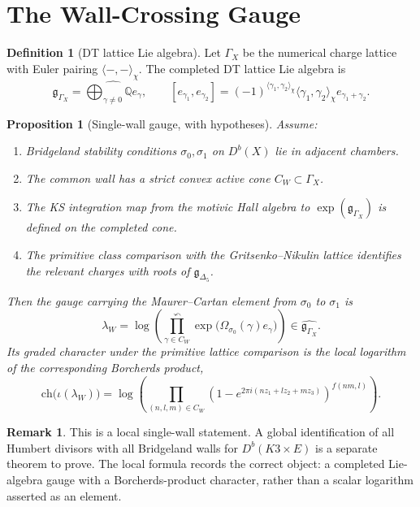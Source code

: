 \documentclass[11pt]{article}
\newtheorem{proposition}[theorem]{Proposition}
\theoremstyle{definition}
\newtheorem{definition}[theorem]{Definition}
\newtheorem{remark}[theorem]{Remark}
\providecommand{\Q}{\mathbb{Q}}
\providecommand{\fg}{\mathfrak{g}}
\begin{document}
\section{The Wall-Crossing Gauge}
\label{sec:gauge}

\begin{definition}[DT lattice Lie algebra]
Let $\Gamma_X$ be the numerical charge lattice with Euler pairing
$\langle-,-\rangle_\chi$. The completed DT lattice Lie algebra is
\[
 \fg_{\Gamma_X}
 =\widehat{\bigoplus_{\gamma\ne 0}\Q e_\gamma},
 \qquad
 [e_{\gamma_1},e_{\gamma_2}]
 =(-1)^{\langle\gamma_1,\gamma_2\rangle_\chi}
 \langle\gamma_1,\gamma_2\rangle_\chi e_{\gamma_1+\gamma_2}.
\]
\end{definition}

\begin{proposition}[Single-wall gauge, with hypotheses]
\label{prop:single-wall-gauge}
Assume:
\begin{enumerate}[label=\textup{(H\arabic*)}]
\item Bridgeland stability conditions $\sigma_0,\sigma_1$ on $D^b(X)$
lie in adjacent chambers.
\item The common wall has a strict convex active cone $C_W\subset\Gamma_X$.
\item The KS integration map from the motivic Hall algebra to
$\exp(\fg_{\Gamma_X})$ is defined on the completed cone.
\item The primitive class comparison with the Gritsenko--Nikulin lattice
identifies the relevant charges with roots of $\fg_{\Delta_5}$.
\end{enumerate}
Then the gauge carrying the Maurer--Cartan element from $\sigma_0$ to
$\sigma_1$ is
\[
 \lambda_W
 = \log\left(
 \prod_{\gamma\in C_W}^{\curvearrowleft}
 \exp\bigl(\Omega_{\sigma_0}(\gamma)e_\gamma\bigr)
 \right)
 \in \widehat{\fg_{\Gamma_X}}.
\]
Its graded character under the primitive lattice comparison is the
local logarithm of the corresponding Borcherds product,
\[
 \mathrm{ch}\bigl(\iota(\lambda_W)\bigr)
 = \log\!\left(
 \prod_{(n,l,m)\in C_W}
 \left(1-e^{2\pi i(nz_1+lz_2+mz_3)}\right)^{f(nm,l)}
 \right).
\]
\end{proposition}

\begin{remark}
This is a local single-wall statement. A global identification of all
Humbert divisors with all Bridgeland walls for $D^b(K3\times E)$ is a
separate theorem to prove. The local formula records the correct
object: a completed Lie-algebra gauge with a Borcherds-product
character, rather than a scalar logarithm asserted as an element.
\end{remark}
\end{document}
